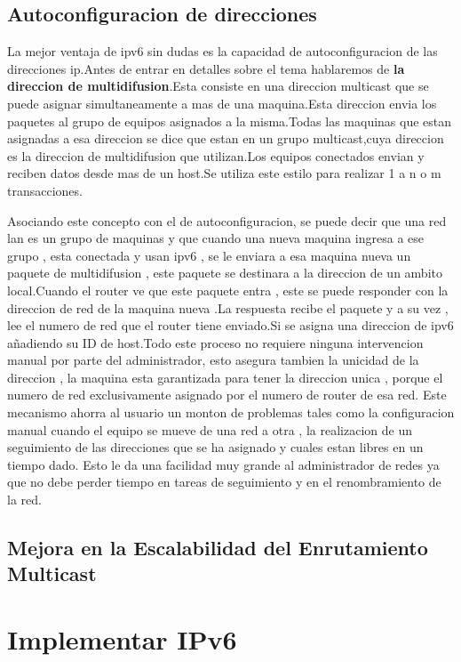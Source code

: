 \documentclass[11pt,a4paper]{article}
\begin{document}
\subsection{Autoconfiguracion de direcciones}
La mejor ventaja de ipv6 sin dudas es la capacidad de autoconfiguracion de las direcciones ip.Antes de entrar en detalles sobre el tema hablaremos de \textbf{la direccion de multidifusion}.Esta consiste en una direccion multicast que se puede asignar simultaneamente a mas de una maquina.Esta direccion envia los paquetes al grupo de equipos asignados a la misma.Todas las maquinas que estan asignadas a esa direccion se dice que  estan en un grupo multicast,cuya direccion es la direccion  de multidifusion que utilizan.Los equipos conectados envian y reciben datos desde mas de un host.Se utiliza este estilo para realizar 1 a n o m transacciones.\par
Asociando este concepto con el de autoconfiguracion, se puede decir que una red lan es un grupo de maquinas y que cuando una nueva maquina ingresa a ese grupo , esta conectada y usan ipv6 , se le enviara a esa maquina nueva un paquete de multidifusion , este paquete se destinara a la  direccion de un ambito local.Cuando el router ve que este paquete entra , este se puede responder con la direccion de red de la maquina nueva .La respuesta recibe el paquete y a su vez , lee el numero de red que el router tiene enviado.Si se asigna una direccion de ipv6 añadiendo su ID de host.Todo este proceso no requiere ninguna intervencion manual por parte del administrador, esto asegura tambien la unicidad de la direccion , la maquina esta garantizada para tener la direccion unica , porque el numero de red exclusivamente asignado por el numero de router de esa red.
 Este mecanismo ahorra al usuario un monton de problemas tales como la configuracion manual cuando el equipo se mueve de una red a otra , la realizacion de un seguimiento de las direcciones que se ha asignado y cuales estan libres en un tiempo dado.
Esto le da una facilidad muy grande al administrador de redes ya que no debe perder tiempo en tareas de seguimiento y en el renombramiento de la red.\par
 \newpage
\subsection{Mejora en la Escalabilidad del Enrutamiento Multicast}


\section{Implementar IPv6}
\end{document}

